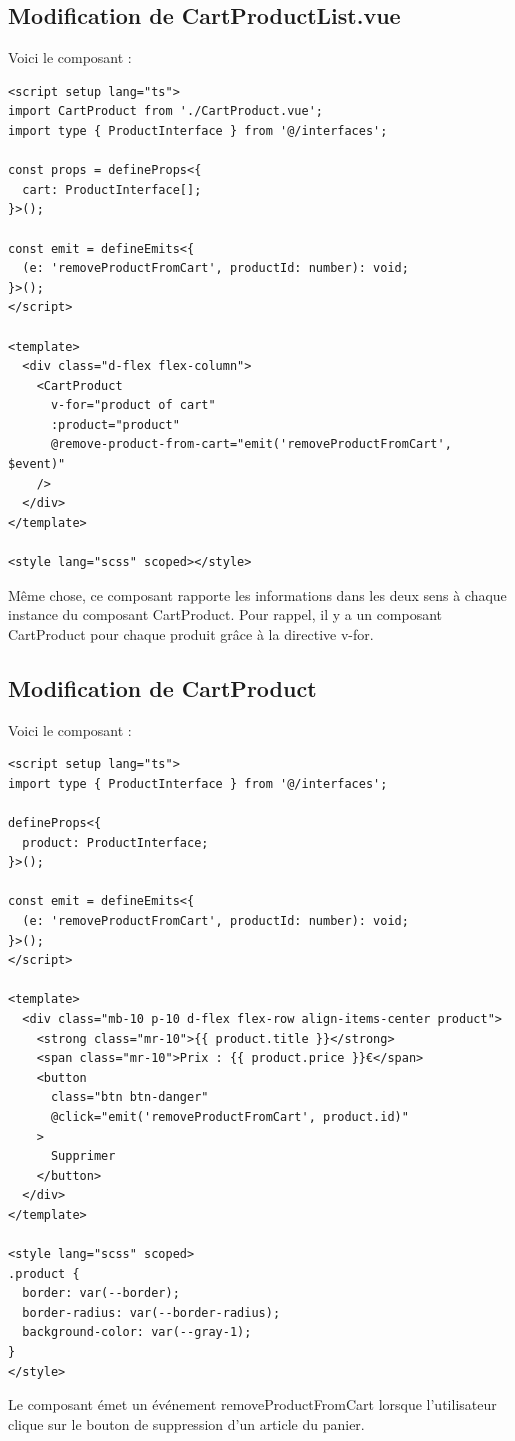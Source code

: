 \documentclass{article}
\begin{document}
\subsection{Modification de {\color{monOrange}CartProductList.vue}}
Voici le composant :
\begin{verbatim}
<script setup lang="ts">
import CartProduct from './CartProduct.vue';
import type { ProductInterface } from '@/interfaces';

const props = defineProps<{
  cart: ProductInterface[];
}>();

const emit = defineEmits<{
  (e: 'removeProductFromCart', productId: number): void;
}>();
</script>

<template>
  <div class="d-flex flex-column">
    <CartProduct
      v-for="product of cart"
      :product="product"
      @remove-product-from-cart="emit('removeProductFromCart', $event)"
    />
  </div>
</template>

<style lang="scss" scoped></style>
\end{verbatim}
Même chose, ce composant rapporte les informations dans les deux sens à chaque instance du composant {\color{monOrange}CartProduct}. Pour rappel, il y a un composant {\color{monOrange}CartProduct} pour chaque produit grâce à la directive {\color{monOrange}v-for}.
\subsection{Modification de {\color{monOrange}CartProduct}}
Voici le composant :
\begin{verbatim}
<script setup lang="ts">
import type { ProductInterface } from '@/interfaces';

defineProps<{
  product: ProductInterface;
}>();

const emit = defineEmits<{
  (e: 'removeProductFromCart', productId: number): void;
}>();
</script>

<template>
  <div class="mb-10 p-10 d-flex flex-row align-items-center product">
    <strong class="mr-10">{{ product.title }}</strong>
    <span class="mr-10">Prix : {{ product.price }}€</span>
    <button
      class="btn btn-danger"
      @click="emit('removeProductFromCart', product.id)"
    >
      Supprimer
    </button>
  </div>
</template>

<style lang="scss" scoped>
.product {
  border: var(--border);
  border-radius: var(--border-radius);
  background-color: var(--gray-1);
}
</style>
\end{verbatim}
Le composant émet un événement {\color{monOrange}removeProductFromCart} lorsque l'utilisateur clique sur le bouton de suppression d'un article du panier.
\end{document}
